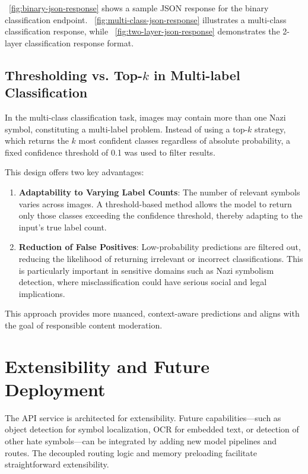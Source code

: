 ~\autoref{fig:binary-json-response} shows a sample \ac{JSON} response for the binary classification endpoint.
~\autoref{fig:multi-class-json-response} illustrates a multi-class classification response, while
~\autoref{fig:two-layer-json-response} demonstrates the 2-layer classification response format.



\subsection{Thresholding vs. Top-$k$ in Multi-label Classification}

In the multi-class classification task, images may contain more than one Nazi symbol, constituting a multi-label
problem. Instead of using a top-$k$ strategy, which returns the $k$ most confident classes regardless of absolute
probability, a fixed confidence threshold of 0.1 was used to filter results.

This design offers two key advantages:

\begin{enumerate}
    \item \textbf{Adaptability to Varying Label Counts}: The number of relevant symbols varies across images. A
    threshold-based method allows the model to return only those classes exceeding the confidence threshold, thereby
    adapting to the input's true label count.

    \item \textbf{Reduction of False Positives}: Low-probability predictions are filtered out, reducing the
    likelihood of returning irrelevant or incorrect classifications. This is particularly important in sensitive
    domains such as Nazi symbolism detection, where misclassification could have serious social and legal implications.
\end{enumerate}

This approach provides more nuanced, context-aware predictions and aligns with the goal of responsible content
moderation.

\section{Extensibility and Future Deployment}

The \ac{API} service is architected for extensibility. Future capabilities—such as object detection for symbol
localization, \ac{OCR} for embedded text, or detection of other hate symbols—can be integrated by adding new model
pipelines and routes. The decoupled routing logic and memory preloading facilitate straightforward extensibility.


